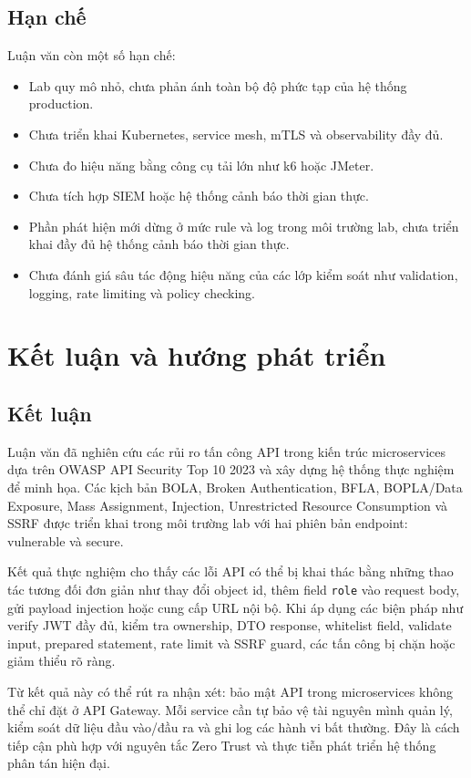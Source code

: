 \documentclass[14pt,a4paper]{extreport}
\begin{document}
\section{Hạn chế}
Luận văn còn một số hạn chế:
\begin{itemize}
  \item Lab quy mô nhỏ, chưa phản ánh toàn bộ độ phức tạp của hệ thống production.
  \item Chưa triển khai Kubernetes, service mesh, mTLS và observability đầy đủ.
  \item Chưa đo hiệu năng bằng công cụ tải lớn như k6 hoặc JMeter.
  \item Chưa tích hợp SIEM hoặc hệ thống cảnh báo thời gian thực.
  \item Phần phát hiện mới dừng ở mức rule và log trong môi trường lab, chưa triển khai đầy đủ hệ thống cảnh báo thời gian thực.
  \item Chưa đánh giá sâu tác động hiệu năng của các lớp kiểm soát như validation, logging, rate limiting và policy checking.
\end{itemize}

\chapter{Kết luận và hướng phát triển}

\section{Kết luận}
Luận văn đã nghiên cứu các rủi ro tấn công API trong kiến trúc microservices dựa trên OWASP API Security Top 10 2023 và xây dựng hệ thống thực nghiệm để minh họa. Các kịch bản BOLA, Broken Authentication, BFLA, BOPLA/Data Exposure, Mass Assignment, Injection, Unrestricted Resource Consumption và SSRF được triển khai trong môi trường lab với hai phiên bản endpoint: vulnerable và secure.

Kết quả thực nghiệm cho thấy các lỗi API có thể bị khai thác bằng những thao tác tương đối đơn giản như thay đổi object id, thêm field \texttt{role} vào request body, gửi payload injection hoặc cung cấp URL nội bộ. Khi áp dụng các biện pháp như verify JWT đầy đủ, kiểm tra ownership, DTO response, whitelist field, validate input, prepared statement, rate limit và SSRF guard, các tấn công bị chặn hoặc giảm thiểu rõ ràng.

Từ kết quả này có thể rút ra nhận xét: bảo mật API trong microservices không thể chỉ đặt ở API Gateway. Mỗi service cần tự bảo vệ tài nguyên mình quản lý, kiểm soát dữ liệu đầu vào/đầu ra và ghi log các hành vi bất thường. Đây là cách tiếp cận phù hợp với nguyên tắc Zero Trust và thực tiễn phát triển hệ thống phân tán hiện đại.
\end{document}
